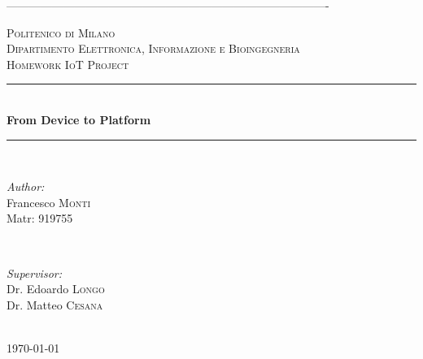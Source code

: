 \documentclass[12pt]{article}
\begin{document}
\begin{titlepage}

\newcommand{\HRule}{\rule{\linewidth}{0.5mm}} 

\center
-------------------------------------------------------------------------------------

\textsc{\LARGE Politenico di Milano}\\[1cm]
\textsc{\Large Dipartimento Elettronica, Informazione e Bioingegneria}\\[0.5cm] 
\textsc{\large Homework IoT Project}\\[0.5cm] 


\HRule \\[0.4cm]
{ \huge \bfseries From Device to Platform}\\[0.4cm]
\HRule \\[1.5cm]
 

\begin{minipage}{0.4\textwidth}
	\begin{flushleft} \large
		\emph{Author:}\\
		Francesco \textsc{Monti}\\
		Matr: 919755 
	\end{flushleft}
\end{minipage}
~
\begin{minipage}{0.4\textwidth}
	\begin{flushright} \large
		\emph{Supervisor:} \\
		Dr. Edoardo \textsc{Longo}\\
		Dr. Matteo \textsc{Cesana}
	\end{flushright}
\end{minipage}\\[1.5cm]



{\large \today}\\[2cm] 


\end{titlepage}
\end{document}
